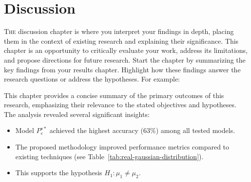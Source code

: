%
%
%
%
%
%

\chapter{Discussion}\label{chap:discussion}
\lettrine[lines=3]{T}{he} discussion chapter is where you interpret your findings in depth, placing them in the context of existing research and explaining their significance. This chapter is an opportunity to critically evaluate your work, address its limitations, and propose directions for future research. Start the chapter by summarizing the key findings from your results chapter. Highlight how these findings answer the research questions or address the hypotheses. For example: 

This chapter provides a concise summary of the primary outcomes of this research, emphasizing their relevance to the stated objectives and hypotheses. The analysis revealed several significant insights:
\begin{itemize}
    \item Model $P_e^{s*}$ achieved the highest accuracy (63\%) among all tested models.
    \item The proposed methodology improved performance metrics compared to existing techniques (see Table~\ref{tab:real-gaussian-distribution}).
    \item This supports the hypothesis $H_1: \mu_1 \neq \mu_2$.
\end{itemize}

